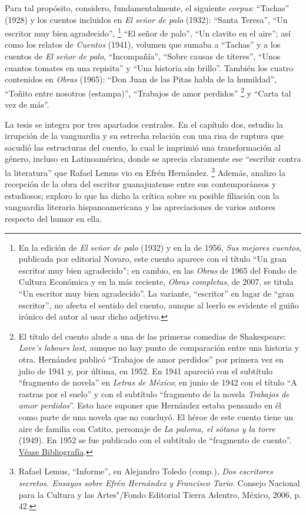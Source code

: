 \documentclass[14pt,twoside,final]{extbook} %
\let\oldfootnote\footnote
\renewcommand\footnote[1]{%
\oldfootnote{\hspace{1mm}#1}}
\begin{document}
Para tal propósito, considero, fundamentalmente, el siguiente \emph{corpus}: ``Tachas'' (1928) y los cuentos incluidos en \emph{El señor de palo} (1932): ``Santa Teresa'', ``Un escritor muy bien agradecido'',\footnote{En la edición de \emph{El señor de palo} (1932) y en la de 1956, \emph{Sus mejores cuentos}, publicada por editorial Novaro, este cuento aparece con el título ``Un gran escritor muy bien agradecido''; en cambio, en las \emph{Obras} de 1965 del Fondo de Cultura Económica y en la más reciente, \emph{Obras completas}, de 2007, se titula ``Un escritor muy bien agradecido''. La variante, ``escritor'' en lugar de ``gran escritor'', no afecta el sentido del cuento, aunque al leerlo es evidente el guiño irónico del autor al usar dicho adjetivo.} ``El señor de palo'', ``Un clavito en el aire''; así como los relatos de \emph{Cuentos} (1941), volumen que sumaba a ``Tachas'' y a los cuentos de \emph{El señor de palo}, ``Incompañía'', ``Sobre causas de títeres'', ``Unos cuantos tomates en una repisita'' y ``Una historia sin brillo''. También los cuatro contenidos en \emph{Obras} (1965): ``Don Juan de las Pitas habla de la humildad'', ``Toñito entre nosotros (estampa)'', ``Trabajos de amor perdidos''\footnote{El título del cuento alude a una de las primeras comedias de Shakespeare: \emph{Love's labours lost}, aunque no hay punto de comparación entre una historia y otra. Hernández publicó ``Trabajos de amor perdidos'' por primera vez en julio de 1941 y, por última, en 1952. En 1941 apareció con el subtítulo ``fragmento de novela'' en \emph{Letras de México}; en junio de 1942 con el título ``A rastras por el suelo'' y con el subtítulo ``fragmento de la novela \emph{Trabajos de amor perdidos}''. Esto hace suponer que Hernández estaba pensando en él como parte de una novela que no concluyó. El héroe de este cuento tiene un aire de familia con Catito, personaje de \emph{La paloma, el sótano y la torre} (1949). En 1952 se fue publicado con el subtítulo de ``fragmento de cuento''. \hyperref[bib:hernandez1952]{Véase Bibliografía}.} y ``Carta tal vez de más''.

La tesis se integra por tres apartados centrales. En el capítulo dos, estudio la irrupción de la vanguardia y su estrecha relación con una risa de ruptura que sacudió las estructuras del cuento, lo cual le imprimió una transformación al género, incluso en Latinoamérica, donde se aprecia claramente ese ``escribir contra la literatura'' que Rafael Lemus vio en Efrén Hernández.\footnote{Rafael Lemus, ``Informe'', en Alejandro Toledo (comp.), \emph{Dos escritores secretos. Ensayos sobre Efrén Hernández y Francisco Tario}. Consejo Nacional para la Cultura y las Artes"/Fondo Editorial Tierra Adentro, México, 2006, p. 42.} Además, analizo la recepción de la obra del escritor guanajuatense entre sus contemporáneos y estudiosos; exploro lo que ha dicho la crítica sobre su posible filiación con la vanguardia literaria hispanoamericana y las apreciaciones de varios autores respecto del humor en ella.
\end{document}
